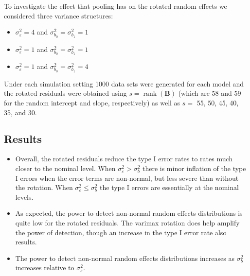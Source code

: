 \documentclass[12pt]{article} %
\DeclareMathOperator{\rank}{rank}
\begin{document}
To investigate the effect that pooling has on the rotated random effects we considered  three variance structures:
%
\begin{itemize}
\item $\sigma^2_\varepsilon = 4$ and  $\sigma^2_{b_0} = \sigma^2_{b_1} = 1$
\item $\sigma^2_\varepsilon = 1$ and  $\sigma^2_{b_0} = \sigma^2_{b_1} = 1$
\item $\sigma^2_\varepsilon = 1$ and  $\sigma^2_{b_0} = \sigma^2_{b_1} = 4$

\end{itemize}
%

Under each simulation setting 1000 data sets were generated for each model and the rotated residuals were obtained using $s = \rank(\bm{B})$ (which are 58 and 59 for the random intercept and slope, respectively) as well as $s =$ 55, 50, 45, 40, 35, and 30.


\subsection{Results}\label{sec:sim-results}




\begin{itemize}
\item Overall, the rotated residuals reduce the type I error rates to rates much closer to the nominal level. When $\sigma^2_\varepsilon > \sigma^2_b$ there is minor inflation of the type I errors when the error terms are non-normal, but less severe than without the rotation. When $\sigma^2_\varepsilon \leq \sigma^2_b$ the type I errors are essentially at the nominal levels.

\item As expected, the power to detect non-normal random effects distributions is quite low for the rotated residuals. The varimax rotation does help amplify the power of detection, though an increase in the type I error rate also results.

\item The power to detect non-normal random effects distributions increases as $\sigma^2_b$ increases relative to $\sigma^2_\varepsilon$.


\end{itemize}
\end{document}
